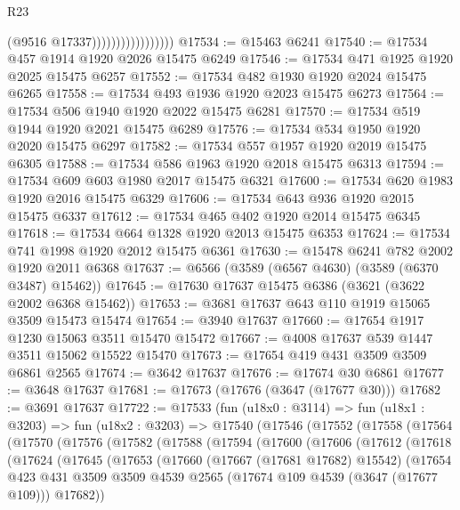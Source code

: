 \begin{lexlean}{R23}
\begin{coremodule}
                                    (@9516 @17337)))))))))))))))))
@17534 := @15463 @6241
@17540 := @17534 @457 @1914 @1920 @2026 @15475 @6249
@17546 := @17534 @471 @1925 @1920 @2025 @15475 @6257
@17552 := @17534 @482 @1930 @1920 @2024 @15475 @6265
@17558 := @17534 @493 @1936 @1920 @2023 @15475 @6273
@17564 := @17534 @506 @1940 @1920 @2022 @15475 @6281
@17570 := @17534 @519 @1944 @1920 @2021 @15475 @6289
@17576 := @17534 @534 @1950 @1920 @2020 @15475 @6297
@17582 := @17534 @557 @1957 @1920 @2019 @15475 @6305
@17588 := @17534 @586 @1963 @1920 @2018 @15475 @6313
@17594 := @17534 @609 @603 @1980 @2017 @15475 @6321
@17600 := @17534 @620 @1983 @1920 @2016 @15475 @6329
@17606 := @17534 @643 @936 @1920 @2015 @15475 @6337
@17612 := @17534 @465 @402 @1920 @2014 @15475 @6345
@17618 := @17534 @664 @1328 @1920 @2013 @15475 @6353
@17624 := @17534 @741 @1998 @1920 @2012 @15475 @6361
@17630 := @15478 @6241 @782 @2002 @1920 @2011 @6368
@17637 := @6566 (@3589 (@6567 @4630) (@3589 (@6370 @3487) @15462))
@17645 := @17630 @17637 @15475 @6386 (@3621 (@3622 @2002 @6368 @15462))
@17653 := @3681 @17637 @643 @110 @1919 @15065 @3509 @15473 @15474
@17654 := @3940 @17637
@17660 := @17654 @1917 @1230 @15063 @3511 @15470 @15472
@17667 := @4008 @17637 @539 @1447 @3511 @15062 @15522 @15470
@17673 := @17654 @419 @431 @3509 @3509 @6861 @2565
@17674 := @3642 @17637
@17676 := @17674 @30 @6861
@17677 := @3648 @17637
@17681 := @17673 (@17676 (@3647 (@17677 @30)))
@17682 := @3691 @17637
@17722 := @17533
    (fun (u18x0 : @3114) =>
    fun (u18x1 : @3203) =>
    fun (u18x2 : @3203) =>
    @17540
      (@17546
        (@17552
          (@17558
            (@17564
              (@17570
                (@17576
                  (@17582
                    (@17588
                      (@17594
                        (@17600
                          (@17606
                            (@17612
                              (@17618
                                (@17624
                                  (@17645
                                    (@17653
                                      (@17660
                                        (@17667 (@17681 @17682) @15542)
                                        (@17654
                                          @423
                                          @431
                                          @3509
                                          @3509
                                          @4539
                                          @2565
                                          (@17674 @109 @4539 (@3647 (@17677 @109)))
                                          @17682))

\end{coremodule}
\end{lexlean}
